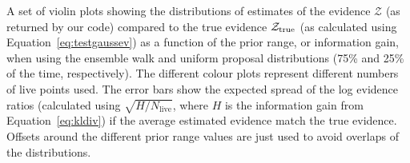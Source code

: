\label{fig:walkunipropevs}
A set of violin plots showing the distributions of estimates of the evidence
$\mathcal{Z}$ (as returned by our code) compared to the true evidence $\mathcal{Z}_{\rm true}$ (as
calculated using Equation~\ref{eq:testgaussev}) as a function of the prior range,
or information gain, when using the ensemble walk and uniform proposal
distributions (75\% and 25\% of the time, respectively). The different colour plots represent different numbers
of live points used. The error bars show the expected spread of the log evidence ratios (calculated using
$\sqrt{H/N_{\text{live}}}$, where $H$ is the information gain from Equation~\ref{eq:kldiv}) if the average estimated
evidence match the true evidence. Offsets around the different prior range values are just used to avoid overlaps of the
distributions.
